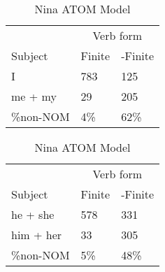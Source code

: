 \begin{table}[]
\caption{Nina ATOM Model}
\begin{minipage}{0.5\textwidth}
    \centering
    \begin{tabular}{@{}lll@{}}
        \toprule
         & \multicolumn{2}{c}{Verb form}\\
         \cline{2-3}
        Subject & Finite & -Finite \\
        \midrule
        I & 783 & 125 \\
        me + my & 29 & 205 \\
        \hline
        \%non-NOM & 4\% & 62\% \\
        \bottomrule
    \end{tabular}
\end{minipage}
\begin{minipage}{0.5\textwidth}
    \centering
    \begin{tabular}{@{}lll@{}}
        \toprule
         & \multicolumn{2}{c}{Verb form}\\
         \cline{2-3}
        Subject & Finite & -Finite \\
        \midrule
        he + she & 578 & 331 \\
        him + her & 33 & 305 \\
        \hline
        \%non-NOM & 5\% & 48\% \\
        \bottomrule
    \end{tabular}
    \end{minipage}


\end{table}

